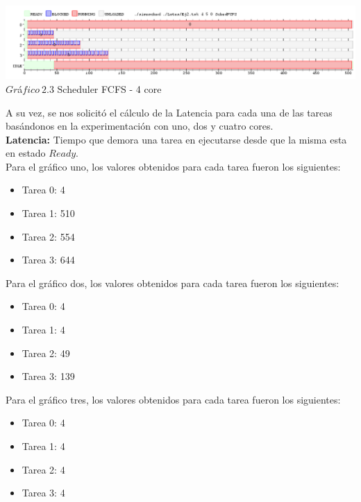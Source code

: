   \vspace*{0.3cm} \vspace*{0.3cm}
  \begin{center}
 \includegraphics[scale=0.5]{ej24nucleo.png}
 { $Gr$\'a$fico \ 2.3$ Scheduler FCFS - 4 core }
 \end{center}
  \vspace*{0.3cm}

A su vez, se nos solicit\'{o} el c\'{a}lculo de la Latencia para cada una de las tareas bas\'{a}ndonos en la 
experimentaci\'{o}n con uno, dos y cuatro cores.\\

\textbf{Latencia:} Tiempo que demora una tarea en ejecutarse desde que la misma esta en estado $Ready$.\\

\indent Para el gr\'{a}fico uno, los valores obtenidos para cada tarea fueron los siguientes:\\

\begin{itemize}
 \item Tarea 0: 4
 \item Tarea 1: 510
 \item Tarea 2: 554
  \item Tarea 3: 644
\end{itemize}

\indent Para el gr\'{a}fico dos, los valores obtenidos para cada tarea fueron los siguientes:\\

\begin{itemize}
 \item Tarea 0: 4
 \item Tarea 1: 4
 \item Tarea 2: 49
  \item Tarea 3: 139
\end{itemize}

\indent Para el gr\'{a}fico tres, los valores obtenidos para cada tarea fueron los siguientes:\\

\begin{itemize}
 \item Tarea 0: 4
 \item Tarea 1: 4
 \item Tarea 2: 4
  \item Tarea 3: 4
\end{itemize}

